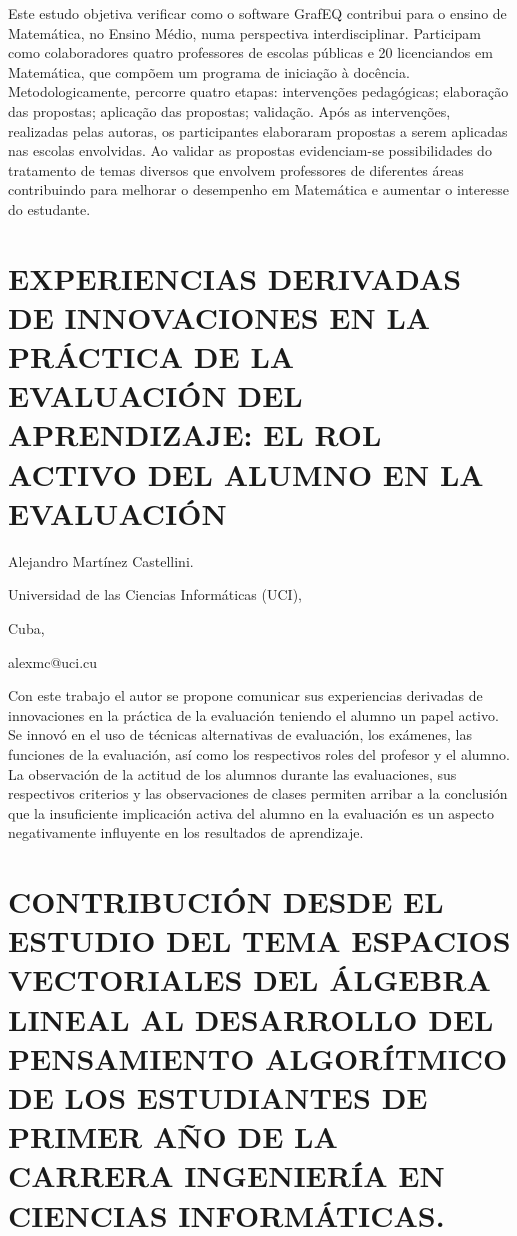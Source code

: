 Este estudo objetiva verificar como o software GrafEQ contribui para
o ensino de Matemática, no Ensino Médio, numa perspectiva interdisciplinar.
Participam como colaboradores quatro professores de escolas públicas
e 20 licenciandos em Matemática, que compõem um programa de iniciação
à docência. Metodologicamente, percorre quatro etapas: intervenções
pedagógicas; elaboração das propostas; aplicação das propostas; validação.
Após as intervenções, realizadas pelas autoras, os participantes elaboraram
propostas a serem aplicadas nas escolas envolvidas. Ao validar as
propostas evidenciam-se possibilidades do tratamento de temas diversos
que envolvem professores de diferentes áreas contribuindo para melhorar
o desempenho em Matemática e aumentar o interesse do estudante.


\section{EXPERIENCIAS DERIVADAS DE INNOVACIONES EN LA PRÁCTICA DE LA EVALUACIÓN
DEL APRENDIZAJE: EL ROL ACTIVO DEL ALUMNO EN LA EVALUACIÓN}

\begin{datos}

Alejandro Martínez Castellini.

Universidad de las Ciencias Informáticas (UCI),

Cuba,

alexmc@uci.cu

\end{datos}

Con este trabajo el autor se propone comunicar sus experiencias derivadas
de innovaciones en la práctica de la evaluación teniendo el alumno
un papel activo. Se innovó en el uso de técnicas alternativas de evaluación,
los exámenes, las funciones de la evaluación, así como los respectivos
roles del profesor y el alumno. La observación de la actitud de los
alumnos durante las evaluaciones, sus respectivos criterios y las
observaciones de clases permiten arribar a la conclusión que la insuficiente
implicación activa del alumno en la evaluación es un aspecto negativamente
influyente en los resultados de aprendizaje.


\section{CONTRIBUCIÓN DESDE EL ESTUDIO DEL TEMA ESPACIOS VECTORIALES DEL ÁLGEBRA
LINEAL AL DESARROLLO DEL PENSAMIENTO ALGORÍTMICO DE LOS ESTUDIANTES
DE PRIMER AÑO DE LA CARRERA INGENIERÍA EN CIENCIAS INFORMÁTICAS. }

